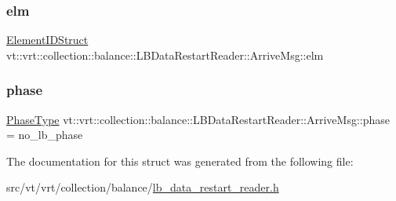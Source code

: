 \subsubsection{\texorpdfstring{elm}{elm}}
{\footnotesize\ttfamily \hyperlink{namespacevt_1_1vrt_1_1collection_1_1balance_a9f5b53fafb270212279a4757d2c4cd28}{Element\+I\+D\+Struct} vt\+::vrt\+::collection\+::balance\+::\+L\+B\+Data\+Restart\+Reader\+::\+Arrive\+Msg\+::elm}

\mbox{\label{structvt_1_1vrt_1_1collection_1_1balance_1_1_l_b_data_restart_reader_1_1_arrive_msg_ae50ef991dd3d09ab883d14e75c15b44b}} 
\subsubsection{\texorpdfstring{phase}{phase}}
{\footnotesize\ttfamily \hyperlink{namespacevt_a46ce6733d5cdbd735d561b7b4029f6d7}{Phase\+Type} vt\+::vrt\+::collection\+::balance\+::\+L\+B\+Data\+Restart\+Reader\+::\+Arrive\+Msg\+::phase = no\+\_\+lb\+\_\+phase}



The documentation for this struct was generated from the following file\+:\begin{DoxyCompactItemize}
\item 
src/vt/vrt/collection/balance/\hyperlink{lb__data__restart__reader_8h}{lb\+\_\+data\+\_\+restart\+\_\+reader.\+h}\end{DoxyCompactItemize}
